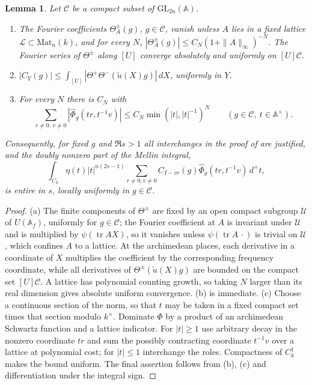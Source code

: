 \documentclass[11pt,oneside,notitlepage]{book}
\numberwithin{equation}{section}
\theoremstyle{plain}
\newtheorem{lemma}[theorem]{Lemma}
\theoremstyle{definition}
\newcommand{\A}{\mathbb{A}}
\newcommand{\GL}{\mathrm{GL}}
\newcommand{\Mat}{\mathrm{Mat}}
\newcommand{\tr}{\operatorname{tr}}
\begin{document}
\begin{lemma}\label{lem:A-fourier}
Let $\mathcal C$ be a compact subset of $\GL_{2n}(\A)$.
\begin{enumerate}[label=(\alph*)]
\item The Fourier coefficients $\Theta^\pm_A(g)$, $g\in\mathcal C$, vanish unless $A$ lies in a fixed lattice $\mathcal L\subset\Mat_n(k)$, and for every $N$, $|\Theta^\pm_A(g)|\le C_N(1+\|A\|_\infty)^{-N}$. The Fourier series of $\Theta^\pm$ along $[U]$ converge absolutely and uniformly on $[U]\mathcal C$.
\item $|C_Y(g)|\le\int_{[U]}|\Theta^+\Theta^-(\tilde u(X)g)|\,dX$, uniformly in $Y$.
\item For every $N$ there is $C_N$ with
\[\sum_{r\ne0,\,v\ne0}|\widehat\Phi_g(tr,t^{-1}v)|\le C_N\min(|t|,|t|^{-1})^N\qquad(g\in\mathcal C,\ t\in\A^\times).\]
\end{enumerate}
Consequently, for fixed $g$ and $\Re s>1$ all interchanges in the proof of  are justified, and the doubly nonzero part of the Mellin integral,\[\int_{C_k}\eta(t)|t|^{n(2s-1)}\sum_{r\ne0,v\ne0}C_{I-vr}(g)\widehat\Phi_g(tr,t^{-1}v)\,d^\times t,\]is entire in $s$, locally uniformly in $g\in\mathcal C$.
\end{lemma}
\begin{proof}
(a) The finite components of $\Theta^\pm$ are fixed by an open compact subgroup $\mathcal U$ of $U(\A_f)$, uniformly for $g\in\mathcal C$; the Fourier coefficient at $A$ is invariant under $\mathcal U$ and is multiplied by $\psi(\tr AX)$, so it vanishes unless $\psi(\tr A\,\cdot)$ is trivial on $\mathcal U$, which confines $A$ to a lattice. At the archimedean places, each derivative in a coordinate of $X$ multiplies the coefficient by the corresponding frequency coordinate, while all derivatives of $\Theta^\pm(\tilde u(X)g)$ are bounded on the compact set $[U]\mathcal C$. A lattice has polynomial counting growth, so taking $N$ larger than its real dimension gives absolute uniform convergence. (b) is immediate. (c) Choose a continuous section of the norm, so that $t$ may be taken in a fixed compact set times that section modulo $k^\times$. Dominate $\Phi$ by a product of an archimedean Schwartz function and a lattice indicator. For $|t|\ge1$ use arbitrary decay in the nonzero coordinate $tr$ and sum the possibly contracting coordinate $t^{-1}v$ over a lattice at polynomial cost; for $|t|\le1$ interchange the roles. Compactness of $C_k^1$ makes the bound uniform. The final assertion follows from (b), (c) and differentiation under the integral sign.
\end{proof}
\end{document}

